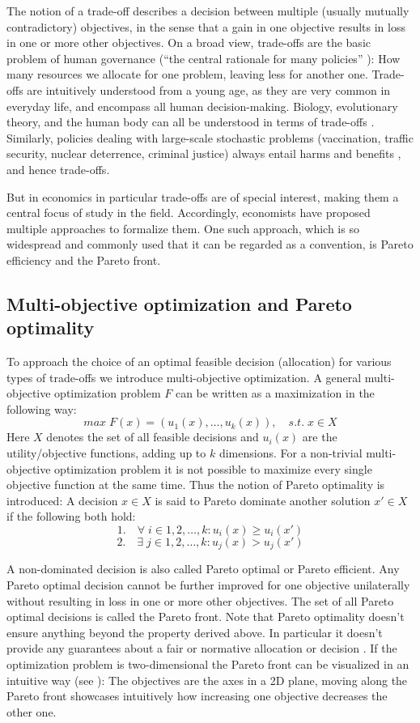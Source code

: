 	The notion of a trade-off describes a decision between multiple (usually mutually contradictory) objectives, in the sense that a gain in one objective results in loss in one or more other objectives.
	On a broad view, trade-offs are the basic problem of human governance (``the central rationale for many policies'' \cite[p.~77]{Hardin1989}):
    How many resources we allocate for one problem, leaving less for another one.
	Trade-offs are intuitively understood from a young age, as they are very common in everyday life, and encompass all human decision-making.
	Biology, evolutionary theory, and the human body can all be understood in terms of trade-offs \cite{Launer2020}.
	Similarly, policies dealing with large-scale stochastic problems (vaccination, traffic security, nuclear deterrence, criminal justice) always entail harms and benefits \cite{Hardin1989}, and hence trade-offs.

	But in economics in particular trade-offs are of special interest, making them a central focus of study in the field.
	Accordingly, economists have proposed multiple approaches to formalize them.
	One such approach, which is so widespread and commonly used that it can be regarded as a convention, is Pareto efficiency and the Pareto front.

	\subsection{Multi-objective optimization and Pareto optimality}

	To approach the choice of an optimal feasible decision (allocation) for various types of trade-offs we introduce multi-objective optimization.
	A general multi-objective optimization problem $F$ can be written as a maximization in the following way:
	$$max \; F(x)=(u_1(x),\dots,u_k(x)), \quad s.t.\; x\in X$$
	Here $X$ denotes the set of all feasible decisions and $u_i(x)$ are the utility/objective functions, adding up to $k$ dimensions.
	For a non-trivial multi-objective optimization problem it is not possible to maximize every single objective function at the same time.
	Thus the notion of Pareto optimality is introduced:
	A decision $x\in X$ is said to Pareto dominate another solution $x'\in X$ if the following both hold:
	$$1.\quad \forall\; i\in {1,2,\dots,k}: u_i(x)\ge u_i(x')$$
	$$2.\quad \exists\; j\in {1,2,\dots,k}: u_j(x) > u_j(x')$$

	A non-dominated decision is also called Pareto optimal or Pareto efficient.
	Any Pareto optimal decision cannot be further improved for one objective unilaterally without resulting in loss in one or more other objectives.
	The set of all Pareto optimal decisions is called the Pareto front.
	Note that Pareto optimality doesn't ensure anything beyond the property derived above.
	In particular it doesn't provide any guarantees about a fair or normative allocation or decision \cite{van2007ethics}.
	If the optimization problem is two-dimensional the Pareto front can be visualized in an intuitive way (see ):
	The objectives are the axes in a 2D plane, moving along the Pareto front showcases intuitively how increasing one objective decreases the other one.

